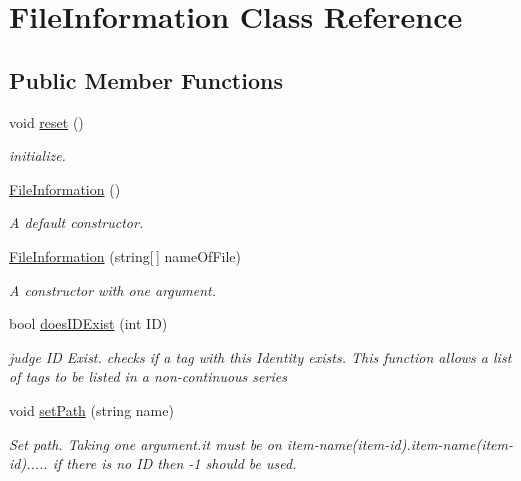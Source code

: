 \hypertarget{class_file_information}{}\section{File\+Information Class Reference}
\label{class_file_information}
\subsection*{Public Member Functions}
\begin{DoxyCompactItemize}
\item 
void \mbox{\hyperlink{class_file_information_a5e19ac29cfc7a806e3af6b346a02578a}{reset}} ()
\begin{DoxyCompactList}\small\item\em initialize. \end{DoxyCompactList}\item 
\mbox{\hyperlink{class_file_information_ada73aa01f63bbe5b451f791923e06bcd}{File\+Information}} ()
\begin{DoxyCompactList}\small\item\em A default constructor. \end{DoxyCompactList}\item 
\mbox{\hyperlink{class_file_information_ae72cab35d7d963bfbe8dafc210ee2988}{File\+Information}} (string\mbox{[}$\,$\mbox{]} name\+Of\+File)
\begin{DoxyCompactList}\small\item\em A constructor with one argument. \end{DoxyCompactList}\item 
bool \mbox{\hyperlink{class_file_information_a4560ca8eebcef612a9e562f1cca644e8}{does\+I\+D\+Exist}} (int ID)
\begin{DoxyCompactList}\small\item\em judge ID Exist. checks if a tag with this Identity exists. This function allows a list of tags to be listed in a non-\/continuous series \end{DoxyCompactList}\item 
void \mbox{\hyperlink{class_file_information_a8ff7c5f71980bfc78f2790d552345f52}{set\+Path}} (string name)
\begin{DoxyCompactList}\small\item\em Set path. Taking one argument.\+it must be on item-\/name(item-\/id).item-\/name(item-\/id)..... if there is no ID then -\/1 should be used. \end{DoxyCompactList}\item 

\end{DoxyCompactItemize}
